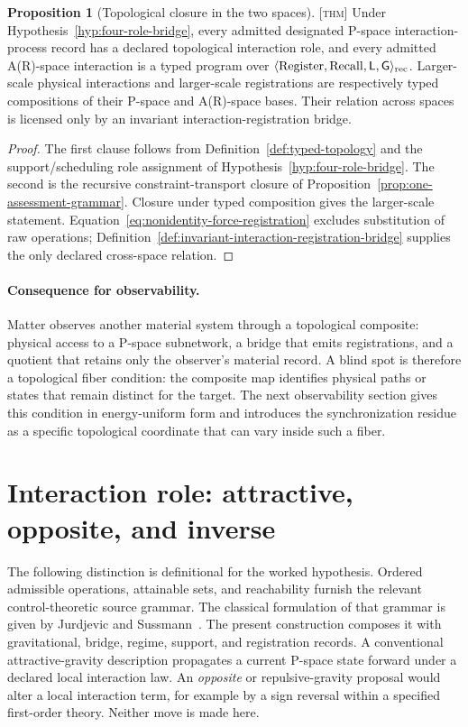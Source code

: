 \documentclass[11pt]{article}
\newcommand{\Register}{\ensuremath{\operatorname{Register}}}
\newcommand{\Recall}{\ensuremath{\operatorname{Recall}}}
\newcommand{\GOp}{\ensuremath{\mathsf{G}}}
\newcommand{\LOp}{\ensuremath{\mathsf{L}}}
\newcommand{\Thm}{\textsc{[thm]}}
\theoremstyle{definition}
\newtheorem{sproposition}{Proposition}
\begin{document}
\begin{sproposition}[Topological closure in the two spaces]
\label{prop:topological-closure-two-spaces}
\Thm{} Under Hypothesis~\ref{hyp:four-role-bridge}, every admitted designated
P-space interaction-process record has a declared topological interaction role,
and every admitted A(R)-space interaction is a typed program over
$\langle\Register,\Recall,\LOp,\GOp\rangle_{\rm rec}$. Larger-scale physical
interactions and larger-scale registrations are respectively typed compositions of
their P-space and A(R)-space bases. Their relation across spaces is licensed only
by an invariant interaction-registration bridge.
\end{sproposition}

\begin{proof}
The first clause follows from Definition~\ref{def:typed-topology} and the
support/scheduling role assignment of Hypothesis~\ref{hyp:four-role-bridge}. The
second is the recursive constraint-transport closure of
Proposition~\ref{prop:one-assessment-grammar}. Closure under typed composition gives
the larger-scale statement. Equation~\eqref{eq:nonidentity-force-registration}
excludes substitution of raw operations; Definition~\ref{def:invariant-interaction-registration-bridge}
supplies the only declared cross-space relation.
\end{proof}

\paragraph{Consequence for observability.}
Matter observes another material system through a topological composite: physical
access to a P-space subnetwork, a bridge that emits registrations, and a quotient
that retains only the observer's material record. A blind spot is therefore a
topological fiber condition: the composite map identifies physical paths or states
that remain distinct for the target. The next observability section gives this
condition in energy-uniform form and introduces the synchronization residue as a
specific topological coordinate that can vary inside such a fiber.

\section{Interaction role: attractive, opposite, and inverse}
\label{supp:interaction-role}

The following distinction is definitional for the worked hypothesis. Ordered
admissible operations, attainable sets, and reachability furnish the relevant
control-theoretic source grammar. The classical formulation of that grammar is
given by Jurdjevic and Sussmann~\cite{S_JurdjevicSussmann1972}. The present
construction composes it with gravitational, bridge, regime, support, and
registration records. A conventional attractive-gravity description
propagates a current P-space state forward under a declared local interaction law.
An \emph{opposite} or repulsive-gravity proposal would alter a local interaction
term, for example by a sign reversal within a specified first-order theory. Neither
move is made here.
\end{document}
